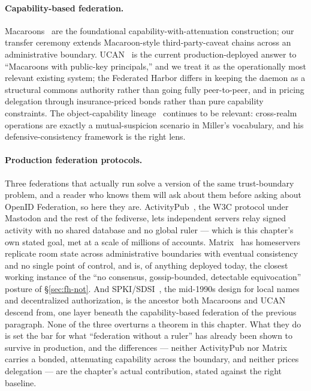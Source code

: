 \documentclass[11pt,a4paper]{article}
\theoremstyle{definition}
\theoremstyle{remark}
\begin{document}
\paragraph{Capability-based federation.} Macaroons~ are the foundational capability-with-attenuation construction; our transfer ceremony extends Macaroon-style third-party-caveat chains across an administrative boundary. UCAN~ is the current production-deployed answer to ``Macaroons with public-key principals,'' and we treat it as the operationally most relevant existing system; the Federated Harbor differs in keeping the daemon as a structural commons authority rather than going fully peer-to-peer, and in pricing delegation through insurance-priced bonds rather than pure capability constraints. The object-capability lineage~ continues to be relevant: cross-realm operations are exactly a mutual-suspicion scenario in Miller's vocabulary, and his defensive-consistency framework is the right lens.

\paragraph{Production federation protocols.} Three federations that actually
run solve a version of the same trust-boundary problem, and a reader who knows
them will ask about them before asking about OpenID Federation, so here they
are. ActivityPub~, the W3C protocol under Mastodon and
the rest of the fediverse, lets independent servers relay signed activity with
no shared database and no global ruler --- which is this chapter's own stated
goal, met at a scale of millions of accounts. Matrix~ has
homeservers replicate room state across administrative boundaries with eventual
consistency and no single point of control, and is, of anything deployed today,
the closest working instance of the ``no consensus, gossip-bounded, detectable
equivocation'' posture of \S\ref{sec:fh-not}. And SPKI/SDSI~,
the mid-1990s design for local names and decentralized authorization, is the
ancestor both Macaroons and UCAN descend from, one layer beneath the
capability-based federation of the previous paragraph. None of the three
overturns a theorem in this chapter. What they do is set the bar for what
``federation without a ruler'' has already been shown to survive in production,
and the differences --- neither ActivityPub nor Matrix carries a bonded,
attenuating capability across the boundary, and neither prices delegation ---
are the chapter's actual contribution, stated against the right baseline.
\end{document}
